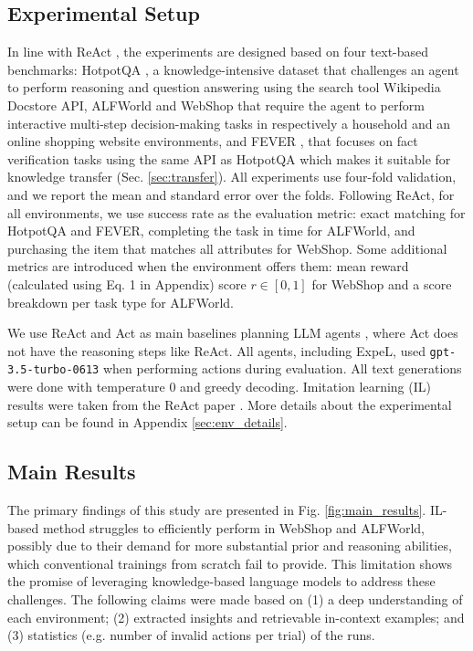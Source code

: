 \documentclass[letterpaper]{article} %
\begin{document}
\subsection{Experimental Setup}
In line with ReAct \cite{yao2022react}, the experiments are designed based on four text-based benchmarks: HotpotQA \cite{yang2018hotpotqa}, a knowledge-intensive dataset that challenges an agent to perform reasoning and question answering using the search tool Wikipedia Docstore API, ALFWorld and WebShop \cite{shridhar2020alfworld, yao2022webshop} that require the agent to perform interactive multi-step decision-making tasks in respectively a household and an online shopping website environments, and FEVER \cite{thorne2018fever}, that focuses on fact verification tasks using the same API as HotpotQA which makes it suitable for knowledge transfer (Sec. \ref{sec:transfer}). All experiments use four-fold validation, and we report the mean and standard error over the folds. Following ReAct, for all environments, we use success rate as the evaluation metric: exact matching for HotpotQA and FEVER, completing the task in time for ALFWorld, and purchasing the item that matches all attributes for WebShop. Some additional metrics are introduced when the environment offers them: mean reward (calculated using Eq. 1 in Appendix) score $r\in [0,1]$ for WebShop and a score breakdown per task type for ALFWorld.

We use ReAct and Act as main baselines planning LLM agents \cite{yao2022react}, where Act does not have the reasoning steps like ReAct. All agents, including ExpeL, used \texttt{gpt-3.5-turbo-0613} when performing actions during evaluation. All text generations were done with temperature 0 and greedy decoding. Imitation learning (IL) results were taken from the ReAct paper \cite{yao2022react}. More details about the experimental setup can be found in Appendix \ref{sec:env_details}.

\subsection{Main Results}

The primary findings of this study are presented in Fig. \ref{fig:main_results}. IL-based method struggles to efficiently perform in WebShop and ALFWorld, possibly due to their demand for more substantial prior and reasoning abilities, which conventional trainings from scratch fail to provide. This limitation shows the promise of leveraging knowledge-based language models to address these challenges. The following claims were made based on (1) a deep understanding of each environment; (2) extracted insights and retrievable in-context examples; and (3) statistics (e.g. number of invalid actions per trial) of the runs.
\end{document}
